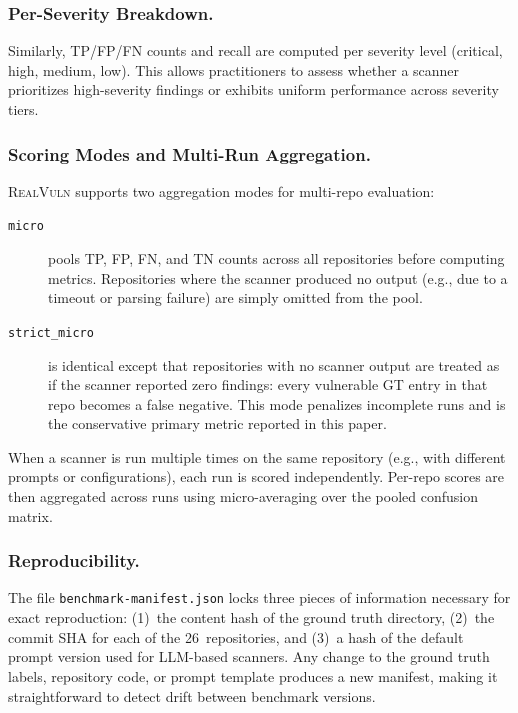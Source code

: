 \subsubsection{Per-Severity Breakdown.}
Similarly, TP/FP/FN counts and recall are computed per severity level (critical, high, medium, low).
This allows practitioners to assess whether a scanner prioritizes high-severity findings or exhibits uniform performance across severity tiers.

\subsubsection{Scoring Modes and Multi-Run Aggregation.}
\textsc{RealVuln} supports two aggregation modes for multi-repo evaluation:

\begin{description}
  \item[\texttt{micro}] pools TP, FP, FN, and TN counts across all repositories before computing metrics. Repositories where the scanner produced no output (e.g., due to a timeout or parsing failure) are simply omitted from the pool.
  \item[\texttt{strict\_micro}] is identical except that repositories with no scanner output are treated as if the scanner reported zero findings: every vulnerable GT entry in that repo becomes a false negative. This mode penalizes incomplete runs and is the conservative primary metric reported in this paper.
\end{description}

\noindent
When a scanner is run multiple times on the same repository (e.g., with different prompts or configurations), each run is scored independently.
Per-repo scores are then aggregated across runs using micro-averaging over the pooled confusion matrix.

\subsubsection{Reproducibility.}
The file \texttt{benchmark-manifest.json} locks three pieces of information necessary for exact reproduction: (1)~the content hash of the ground truth directory, (2)~the commit SHA for each of the 26~repositories, and (3)~a hash of the default prompt version used for LLM-based scanners.
Any change to the ground truth labels, repository code, or prompt template produces a new manifest, making it straightforward to detect drift between benchmark versions.
